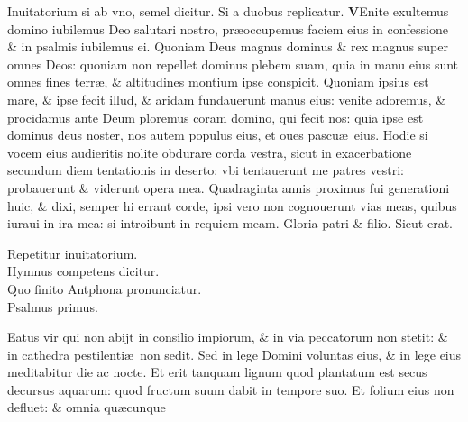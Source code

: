 \documentclass[a5paper,10pt]{book}
\def\ae{æ}
\begin{document}
\begin{multicols*}{2}
\newline
\color{red} Inuitatorium si ab vno, semel dicitur. Si a duobus replicatur. \color{black}
\vspace{-.25em}
\lettrine[lines=2]{\bfseries \color{red} V}{}Enite exultemus domino iubilemus Deo salutari nostro, pr\ae occupemus faciem eius in confessione \& in psalmis iubilemus ei.
\newline
\color{red} Q\color{black}uoniam Deus magnus dominus \& rex magnus super omnes %
Deos: quoniam non repellet dominus plebem suam, quia in manu eius sunt omnes fines terr\ae , \& altitudines montium ipse conspicit.
\newline
\color{red} Q\color{black}uoniam ipsius est mare, \& ipse fecit illud, \& aridam fundauerunt manus eius: venite adoremus, \& procidamus ante Deum ploremus coram domino, qui fecit nos: quia ipse est dominus deus noster, nos autem populus eius, et oues pascu\ae \ eius.
\newline
\color{red} H\color{black}odie si vocem eius audieritis nolite obdurare corda vestra, sicut in exacerbatione secundum diem tentationis in deserto: vbi tentauerunt me patres vestri: probauerunt \& viderunt opera mea.
\newline
\color{red} Q\color{black}uadraginta annis proximus fui generationi huic, \& dixi, semper hi errant corde, ipsi vero non cognouerunt vias meas, quibus iuraui in ira mea: si introibunt in requiem meam.
\newline
\color{red} G\color{black}loria patri \& filio. Sicut erat.
\vspace{-1em}
\begin{center} \color{red}
Repetitur inuitatorium.\\
Hymnus competens dicitur.\\
Quo finito Antphona pronunciatur.\\
Psalmus primus.
\end{center}
\vspace{-1em}
Eatus vir qui non abijt in consilio impiorum, \& in via peccatorum non stetit: \& in cathedra pestilenti\ae \ non sedit.
\newline \color{red} S\color{black}ed in lege Domini voluntas eius, \& in lege eius meditabitur die ac nocte.
\newline \color{red} E\color{black}t erit tanquam lignum quod plantatum est secus decursus aquarum: quod fructum suum dabit in tempore suo.
\newline \color{red} E\color{black}t folium eius non defluet: \& omnia qu\ae cunque %

\end{multicols*}
\end{document}
